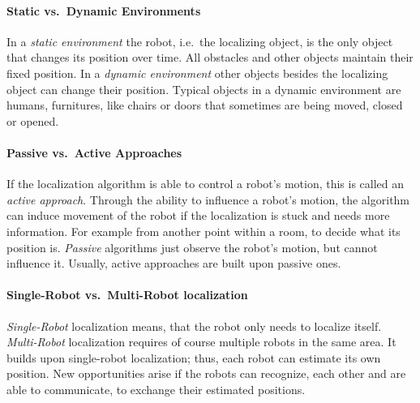 \paragraph{Static vs.\ Dynamic Environments} In a \emph{static environment} the robot, i.e.\ the localizing object, is the only object that changes its position over time. All obstacles and other objects maintain their fixed position. In a \emph{dynamic environment} other objects besides the localizing object can change their position. Typical objects in a dynamic environment are humans, furnitures, like chairs or doors that sometimes are being moved, closed or opened.

\paragraph{Passive vs.\ Active Approaches} If the localization algorithm is able to control a robot's motion, this is called an \emph{active approach}. Through the ability to influence a robot's motion, the algorithm can induce movement of the robot if the localization is stuck and needs more information. For example from another point within a room, to decide what its position is. \emph{Passive} algorithms just observe the robot's motion, but cannot influence it. Usually, active approaches are built upon passive ones.

\paragraph{Single-Robot vs.\ Multi-Robot localization} \emph{Single-Robot} localization means, that the robot only needs to localize itself. \emph{Multi-Robot} localization requires of course multiple robots in the same area. It builds upon single-robot localization; thus, each robot can estimate its own position. New opportunities arise if the robots can recognize, each other and are able to communicate, to exchange their estimated positions.


